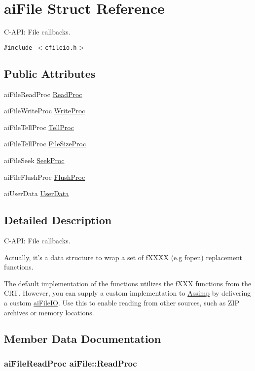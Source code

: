 \hypertarget{structai_file}{
\section{aiFile Struct Reference}
\label{structai_file}
}
C-API: File callbacks.  


{\tt \#include $<$cfileio.h$>$}

\subsection*{Public Attributes}
\begin{CompactItemize}
\item 
aiFileReadProc \hyperlink{structai_file_52287e81ca67b9d43cc1ce6142f781fa}{ReadProc}
\item 
aiFileWriteProc \hyperlink{structai_file_b9fca3a62e34a33592c13a6f31db7d1d}{WriteProc}
\item 
aiFileTellProc \hyperlink{structai_file_af2d88a3b2fcbdacf51119658283d27e}{TellProc}
\item 
aiFileTellProc \hyperlink{structai_file_ff2fff8c0458e7ec71f7de217c3a3033}{FileSizeProc}
\item 
aiFileSeek \hyperlink{structai_file_7a07b499be4ad433669246479a4d4ad2}{SeekProc}
\item 
aiFileFlushProc \hyperlink{structai_file_1102d28d1c0be68ffed20476669bdb0d}{FlushProc}
\item 
aiUserData \hyperlink{structai_file_ec528fa18f4755fe4f28d604fde28aad}{UserData}
\end{CompactItemize}


\subsection{Detailed Description}
C-API: File callbacks. 

Actually, it's a data structure to wrap a set of fXXXX (e.g fopen) replacement functions.

The default implementation of the functions utilizes the fXXX functions from the CRT. However, you can supply a custom implementation to \hyperlink{namespace_assimp}{Assimp} by delivering a custom \hyperlink{structai_file_i_o}{aiFileIO}. Use this to enable reading from other sources, such as ZIP archives or memory locations. 

\subsection{Member Data Documentation}
\hypertarget{structai_file_52287e81ca67b9d43cc1ce6142f781fa}{
\subsubsection[ReadProc]{\setlength{\rightskip}{0pt plus 5cm}aiFileReadProc {\bf aiFile::ReadProc}}}
\label{structai_file_52287e81ca67b9d43cc1ce6142f781fa}


